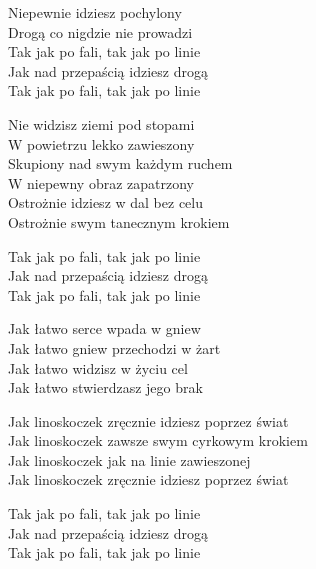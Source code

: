 \begin{text}
    Niepewnie idziesz pochylony\\
    Drogą co nigdzie nie prowadzi\\
    Tak jak po fali, tak jak po linie\\
    Jak nad przepaścią idziesz drogą\\
    Tak jak po fali, tak jak po linie

    Nie widzisz ziemi pod stopami\\
    W powietrzu lekko zawieszony\\
    Skupiony nad swym każdym ruchem\\
    W niepewny obraz zapatrzony\\
    Ostrożnie idziesz w dal bez celu\\
    Ostrożnie swym tanecznym krokiem

    Tak jak po fali, tak jak po linie\\
    Jak nad przepaścią idziesz drogą\\
    Tak jak po fali, tak jak po linie

    Jak łatwo serce wpada w gniew\\
    Jak łatwo gniew przechodzi w żart\\
    Jak łatwo widzisz w życiu cel\\
    Jak łatwo stwierdzasz jego brak

    Jak linoskoczek zręcznie idziesz poprzez świat\\
    Jak linoskoczek zawsze swym cyrkowym krokiem\\
    Jak linoskoczek jak na linie zawieszonej\\
    Jak linoskoczek zręcznie idziesz poprzez świat

    Tak jak po fali, tak jak po linie\\
    Jak nad przepaścią idziesz drogą\\
    Tak jak po fali, tak jak po linie
\end{text}
